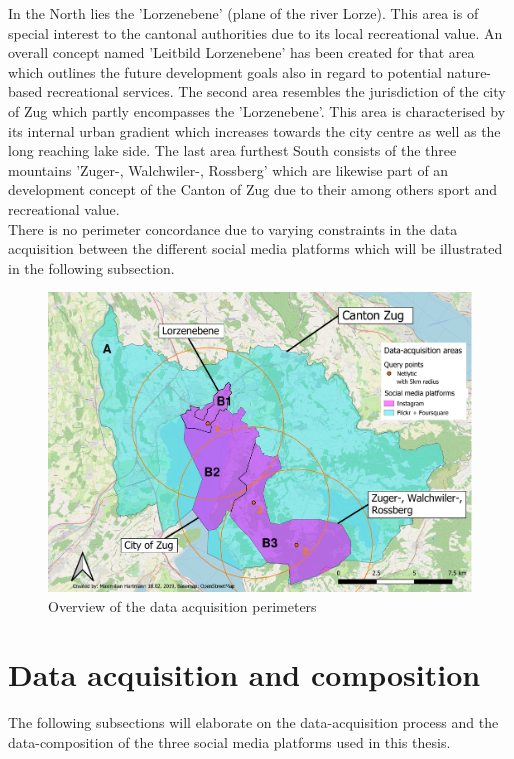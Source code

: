 In the North lies the 'Lorzenebene' (plane of the river Lorze). This area is of special interest to the cantonal authorities due to its local recreational value. An overall concept named 'Leitbild Lorzenebene'  \parencite{BaudirektiondesKantonsZug2012} has been created for that area which outlines the future development goals also in regard to potential nature-based recreational services. The second area resembles the jurisdiction of the city of Zug which partly encompasses the 'Lorzenebene'. This area is characterised by its internal urban gradient which increases towards the city centre as well as the long reaching lake side. The last area furthest South consists of the three mountains 'Zuger-, Walchwiler-, Rossberg' which are likewise part of an development concept \parencite{Berchtold2011} of the Canton of Zug due to their among others sport and recreational value. \\
There is no perimeter concordance due to varying constraints in the data acquisition between the different social media platforms which will be illustrated in the following subsection.

\begin{figure}[h]
   \centering
   \includegraphics[width=\textwidth]{img/overview_research_area_w_Lorzenebene_edited.pdf}
   \caption{Overview of the data acquisition perimeters}
   \label{fig:research_area}
\end{figure}


\section{Data acquisition and composition} \label{data_acquisition}
The following subsections will elaborate on the data-acquisition process and the data-composition of the three social media platforms used in this thesis. 

